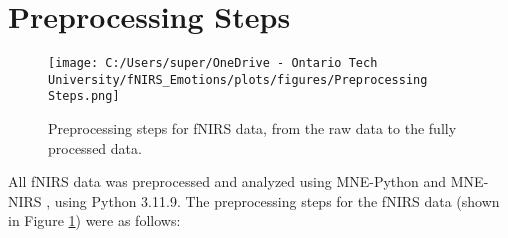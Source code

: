 \section{Preprocessing Steps}
\begin{figure}[H]
    \centering
    \texttt{[image: C:/Users/super/OneDrive - Ontario Tech University/fNIRS\_Emotions/plots/figures/Preprocessing Steps.png]}
    \caption{Preprocessing steps for fNIRS data, from the raw data to the fully processed data. }
    \label{fig:preprocessing_steps}
\end{figure}

All fNIRS data was preprocessed and analyzed using MNE-Python \citep{gramfort_meg_2013} and MNE-NIRS \citep{luke_analysis_2021}, using Python 3.11.9. 
The preprocessing steps for the fNIRS data (shown in Figure \ref{fig:preprocessing_steps}) were as follows:

